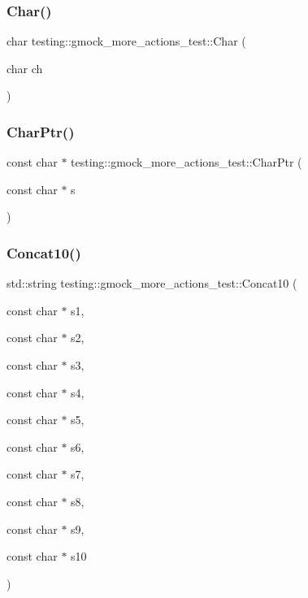 \subsubsection{\texorpdfstring{Char()}{Char()}}
{\footnotesize\ttfamily char testing\+::gmock\+\_\+more\+\_\+actions\+\_\+test\+::\+Char (\begin{DoxyParamCaption}\item[{char}]{ch }\end{DoxyParamCaption})\hspace{0.3cm}{\ttfamily [inline]}}

\mbox{\label{namespacetesting_1_1gmock__more__actions__test_a1dca0066cfa8595506df9bd0be2148db}} 
\subsubsection{\texorpdfstring{CharPtr()}{CharPtr()}}
{\footnotesize\ttfamily const char $\ast$ testing\+::gmock\+\_\+more\+\_\+actions\+\_\+test\+::\+Char\+Ptr (\begin{DoxyParamCaption}\item[{const char $\ast$}]{s }\end{DoxyParamCaption})\hspace{0.3cm}{\ttfamily [inline]}}

\mbox{\label{namespacetesting_1_1gmock__more__actions__test_a4a2fcb45125cd238e4146a4b0c568414}} 
\subsubsection{\texorpdfstring{Concat10()}{Concat10()}}
{\footnotesize\ttfamily std\+::string testing\+::gmock\+\_\+more\+\_\+actions\+\_\+test\+::\+Concat10 (\begin{DoxyParamCaption}\item[{const char $\ast$}]{s1,  }\item[{const char $\ast$}]{s2,  }\item[{const char $\ast$}]{s3,  }\item[{const char $\ast$}]{s4,  }\item[{const char $\ast$}]{s5,  }\item[{const char $\ast$}]{s6,  }\item[{const char $\ast$}]{s7,  }\item[{const char $\ast$}]{s8,  }\item[{const char $\ast$}]{s9,  }\item[{const char $\ast$}]{s10 }\end{DoxyParamCaption})}

